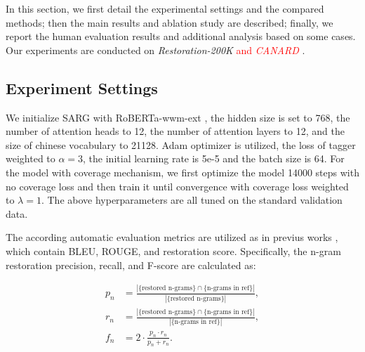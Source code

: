 In this section, we first detail the experimental settings and the compared methods; then the main results and ablation study are described; finally, we report the human evaluation results and additional analysis based on some cases. Our experiments are conducted on \textit{Restoration-200K} \cite{pan2019improving} \textcolor{red}{and \textit{CANARD} \cite{elgohary-etal-2019-unpack}}. 




\subsection{Experiment Settings}\label{setting}
We initialize  SARG with RoBERTa-wwm-ext \cite{chinese-bert-wwm}, the hidden size is set to 768, the number of attention heads to 12, the number of attention layers to 12, and the size of chinese vocabulary to 21128. Adam optimizer is utilized, the loss of tagger weighted to $\alpha = 3$, the initial learning rate is 5e-5 and the batch size is 64. For the model with coverage mechanism, we first optimize the model 14000 steps with no coverage loss and then train it until convergence with coverage loss weighted to $\lambda = 1$. The above hyperparameters are all tuned on the standard validation data.

The according automatic evaluation metrics are utilized as in previus works \cite{pan2019improving, elgohary-etal-2019-unpack}, which contain BLEU, ROUGE, and restoration score. Specifically, the n-gram restoration precision, recall, and F-score are calculated as:
\begin{linenomath}
\begin{align}
p_n &= \frac{|\{\textrm{restored n-grams}\} \cap \{\textrm{n-grams in ref}\}|}{|\{\textrm{restored n-grams}\}|}, \\
r_n &= \frac{|\{\textrm{restored n-grams}\} \cap \{\textrm{n-grams in ref}\}|}{|\{\textrm{n-grams in ref}\}|}, \\
f_n &= 2 \cdot \frac{p_n \cdot r_n}{p_n + r_n}.
\end{align}
\end{linenomath}


